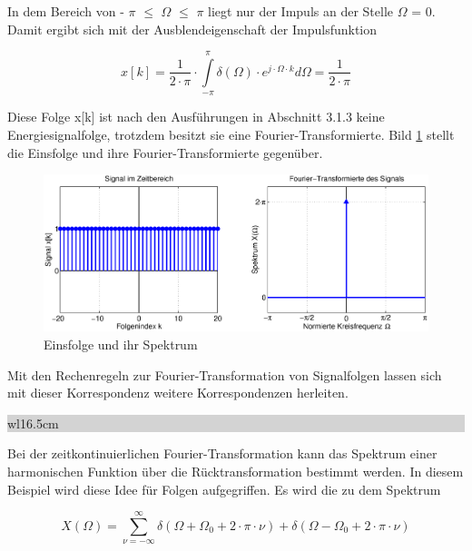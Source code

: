 \noindent In dem Bereich von - $\pi$ $\leq$ $\Omega$ $\leq$ $\pi$ liegt nur der Impuls an der Stelle $\Omega$ = 0. Damit ergibt sich mit der Ausblendeigenschaft der Impulsfunktion

\begin{equation}\label{eq:sevenfourtyfour}
x\left[k\right]=\frac{1}{2\cdot \pi } \cdot \int\limits _{-\pi }^{\pi }\delta \left(\Omega \right)\cdot e^{j\cdot \Omega \cdot k} d\Omega  =\frac{1}{2\cdot \pi }
\end{equation}

\noindent Diese Folge x[k] ist nach den Ausf\"{u}hrungen in Abschnitt 3.1.3 keine Energiesignalfolge, trotzdem besitzt sie eine Fourier-Transformierte. Bild \ref{fig:FourierEinsfolge} stellt die Einsfolge und ihre Fourier-Transformierte gegen\"{u}ber.

\begin{figure}[H]
  \centerline{\includegraphics[width=1\textwidth]{Kapitel7/Bilder/image5.eps}}
  \caption{Einsfolge und ihr Spektrum}
  \label{fig:FourierEinsfolge}
\end{figure}

\noindent Mit den Rechenregeln zur Fourier-Transformation von Signalfolgen lassen sich mit dieser Korrespondenz weitere Korrespondenzen herleiten. \bigskip

\noindent
\colorbox{lightgray}{%
%
\renewcommand\arraystretch{0.6}%
\begin{tabular}{ wl{16.5cm} }
{\selectfont{Beispiel: Korrespondenz der Kosinusfolge}}
\end{tabular}%
}\medskip

\noindent Bei der zeitkontinuierlichen Fourier-Transformation kann das Spektrum einer harmonischen Funktion \"{u}ber die R\"{u}cktransformation bestimmt werden. In diesem Beispiel wird diese Idee f\"{u}r Folgen aufgegriffen. Es wird die zu dem Spektrum 

\begin{equation}\label{eq:sevenfourtyfive}
X\left(\Omega \right)=\sum _{\nu =-\infty }^{\infty }\delta \left(\Omega +\Omega _{0} +2\cdot \pi \cdot \nu \right)+\delta \left(\Omega -\Omega _{0} +2\cdot \pi \cdot \nu \right)
\end{equation}

